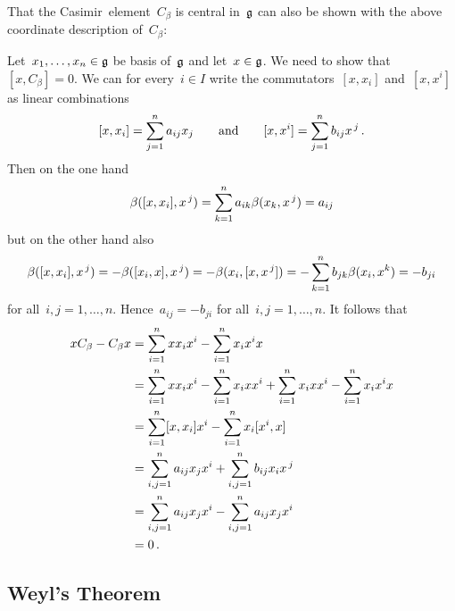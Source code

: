 \begin{remark}
  That the Casimir~element~$C_\beta$ is central in~$\mathfrak{g}$ can also be shown with the above coordinate description of~$C_\beta$:
  
  Let~$x_1, \dotsc, x_n \in \mathfrak{g}$ be basis of~$\mathfrak{g}$ and let~$x \in \mathfrak{g}$.
  We need to show that~$[x, C_\beta] = 0$.
  We can for every~$i \in I$ write the commutators~$[x, x_i]$ and~$[x, x^i]$ as linear combinations
  \[
    [x, x_i]
    =
    \sum_{j=1}^n a_{ij} x_j
    \qquad\text{and}\qquad
    [x, x^i]
    =
    \sum_{j=1}^n b_{ij} x^{\, j} \,.
  \]
  Then on the one hand
  \[
    \beta([x, x_i], x^{\, j})
    =
    \sum_{k=1}^n a_{ik} \beta(x_k, x^{\, j})
    =
    a_{ij}
  \]
  but on the other hand also
  \[
    \beta([x, x_i], x^{\, j})
    =
    -\beta([x_i, x], x^{\, j})
    =
    -\beta(x_i, [x, x^{\, j}])
    =
    -\sum_{k=1}^n b_{jk} \beta(x_i, x^k)
    =
    -b_{ji}
  \]
  for all~$i, j = 1, \dotsc, n$.
  Hence~$a_{ij} = -b_{ji}$ for all~$i, j = 1, \dotsc, n$.
  It follows that
  \begin{align*}
    x C_\beta - C_\beta x
    &=
    \sum_{i=1}^n x x_i x^i - \sum_{i=1}^n x_i x^i x
    \\
    &=
      \sum_{i=1}^n x x_i x^i
    - \sum_{i=1}^n x_i x x^i
    + \sum_{i=1}^n x_i x x^i
    - \sum_{i=1}^n x_i x^i x
    \\
    &=
    \sum_{i=1}^n [x, x_i] x^i - \sum_{i=1}^n x_i [x^i, x]
    \\
    &=
    \sum_{i,j=1}^n a_{ij} x_j x^i + \sum_{i,j=1}^n b_{ij} x_i x^{\, j}
    \\
    &=
    \sum_{i,j=1}^n a_{ij} x_j x^i - \sum_{i,j=1}^n a_{ij} x_j x^i
    \\
    &=
    0 \,.
  \end{align*}
\end{remark}





\subsection{Weyl’s Theorem}


